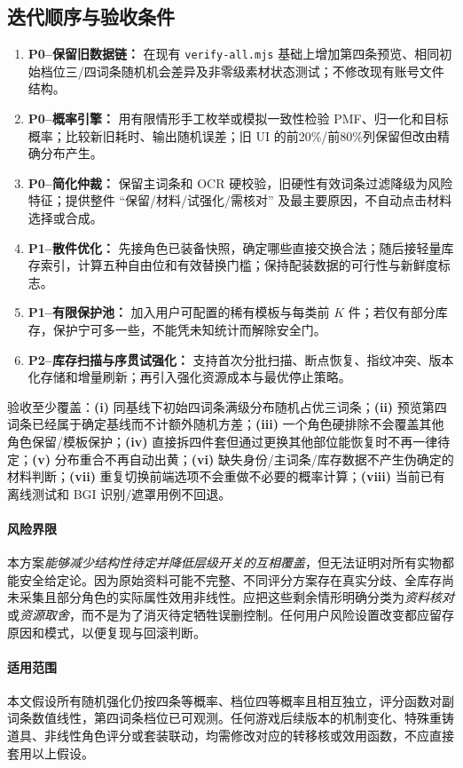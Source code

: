 \documentclass[11pt,a4paper]{ctexart}
\begin{document}
\subsection{迭代顺序与验收条件}
\begin{enumerate}
\item \textbf{P0--保留旧数据链：} 在现有 \texttt{verify-all.mjs} 基础上增加第四条预览、相同初始档位三/四词条随机机会差异及非零级素材状态测试；不修改现有账号文件结构。
\item \textbf{P0--概率引擎：} 用有限情形手工枚举或模拟一致性检验 PMF、归一化和目标概率；比较新旧耗时、输出随机误差；旧 UI 的前20\%/前80\%列保留但改由精确分布产生。
\item \textbf{P0--简化仲裁：} 保留主词条和 OCR 硬校验，旧硬性有效词条过滤降级为风险特征；提供整件 ``保留/材料/试强化/需核对'' 及最主要原因，不自动点击材料选择或合成。
\item \textbf{P1--散件优化：} 先接角色已装备快照，确定哪些直接交换合法；随后接轻量库存索引，计算五种自由位和有效替换门槛；保持配装数据的可行性与新鲜度标志。
\item \textbf{P1--有限保护池：} 加入用户可配置的稀有模板与每类前 $K$ 件；若仅有部分库存，保护宁可多一些，不能凭未知统计而解除安全门。
\item \textbf{P2--库存扫描与序贯试强化：} 支持首次分批扫描、断点恢复、指纹冲突、版本化存储和增量刷新；再引入强化资源成本与最优停止策略。
\end{enumerate}
验收至少覆盖：\textbf{(i)} 同基线下初始四词条满级分布随机占优三词条；\textbf{(ii)} 预览第四词条已经属于确定基线而不计额外随机方差；\textbf{(iii)} 一个角色硬排除不会覆盖其他角色保留/模板保护；\textbf{(iv)} 直接拆四件套但通过更换其他部位能恢复时不再一律待定；\textbf{(v)} 分布重合不再自动出黄；\textbf{(vi)} 缺失身份/主词条/库存数据不产生伪确定的材料判断；\textbf{(vii)} 重复切换前端选项不会重做不必要的概率计算；\textbf{(viii)} 当前已有离线测试和 BGI 识别/遮罩用例不回退。

\paragraph{风险界限}
本方案\emph{能够减少结构性待定并降低层级开关的互相覆盖}，但无法证明对所有实物都能安全给定论。因为原始资料可能不完整、不同评分方案存在真实分歧、全库存尚未采集且部分角色的实际属性效用非线性。应把这些剩余情形明确分类为\emph{资料核对}或\emph{资源取舍}，而不是为了消灭待定牺牲误删控制。任何用户风险设置改变都应留存原因和模式，以便复现与回滚判断。

\paragraph{适用范围} 本文假设所有随机强化仍按四条等概率、档位四等概率且相互独立，评分函数对副词条数值线性，第四词条档位已可观测。任何游戏后续版本的机制变化、特殊重铸道具、非线性角色评分或套装联动，均需修改对应的转移核或效用函数，不应直接套用以上假设。
\end{document}
